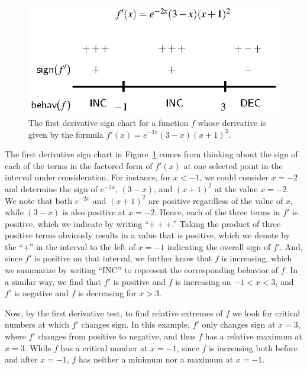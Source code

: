 \begin{figure}[h]
\begin{center}
\includegraphics{figures/3_1_signchart.eps}
\caption{The first derivative sign chart for a function $f$ whose derivative is given by the formula $f'(x) = e^{-2x}(3-x)(x+1)^2$.} \label{F:3.1.signchart}
\end{center}
\end{figure}

The first derivative sign chart in Figure~\ref{F:3.1.signchart} comes from thinking about the sign of each of the terms in the factored form of $f'(x)$ at one selected point in the interval under consideration.  For instance, for $x < -1$, we could consider $x = -2$ and determine the sign of $e^{-2x}$, $(3-x)$, and $(x+1)^2$ at the value $x = -2$.  We note that both $e^{-2x}$ and $(x+1)^2$ are positive regardless of the value of $x$, while $(3-x)$ is also positive at $x = -2$.  Hence, each of the three terms in $f'$ is positive, which we indicate by writing ``$+++$.''  Taking the product of three positive terms obviously results in a value that is positive, which we denote by the ``$+$'' in the interval to the left of $x = -1$ indicating the overall sign of $f'$.  And, since $f'$ is positive on that interval, we further know that $f$ is increasing, which we summarize by writing ``INC'' to represent the corresponding behavior of $f$.  In a similar way, we find that $f'$ is positive and $f$ is increasing on $-1 < x < 3$, and $f'$ is negative and $f$ is decreasing for $x > 3$.

Now, by the first derivative test, to find relative extremes of $f$ we look for critical numbers at which $f'$ changes sign.  In this example, $f'$ only changes sign at $x = 3$, where $f'$ changes from positive to negative, and thus $f$ has a relative maximum at $x = 3$.  While $f$ has a critical number at $x = -1$, since $f$ is increasing both before and after $x = -1$, $f$ has neither a minimum nor a maximum at $x = -1$.

